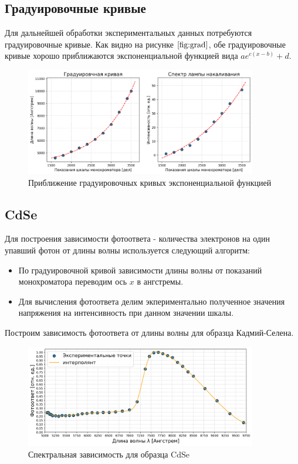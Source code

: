 \documentclass[a4paper, 14pt]{article}
\begin{document}
\subsection*{\textcolor{sub_header}{Градуировочные кривые}}

Для дальнейшей обработки экспериментальных данных потребуются градуировочные кривые.
Как видно на рисунке $\ref{fig:grad}$, обе градуировочные кривые хорошо приближаются 
экспоненциальной функцией вида $a e^{c(x - b)} + d$.

\begin{figure}[htbp]
    \centering
    \includegraphics[width=0.9\textwidth]{grad.png}

    \caption{Приближение градуировочных кривых экспоненциальной функцией}
    \label{fig:grad}
\end{figure}




\subsection*{\textcolor{sub_header}{CdSe}}

Для построения зависимости \textcolor{defenition}{фотоответа} - количества электронов на
один упавший фотон от длины волны используется следующий алгоритм:
\begin{itemize}
    \item По градуировочной кривой зависимости длины волны от показаний монохроматора переводим ось $x$ в ангстремы.
    \item Для вычисления фотоответа делим экпериментально полученное значения напряжения на интенсивность при данном значении шкалы.
\end{itemize}

Построим зависимость фотоответа от длины волны для образца Кадмий-Селена.
\begin{figure}[htbp]
    \centering
    \includegraphics[width = 0.9\textwidth]{CdSe_main.png}
    \caption{Спектральная зависимость для образца CdSe}
    \label{fig:CdSe_main}
\end{figure}
\end{document}
